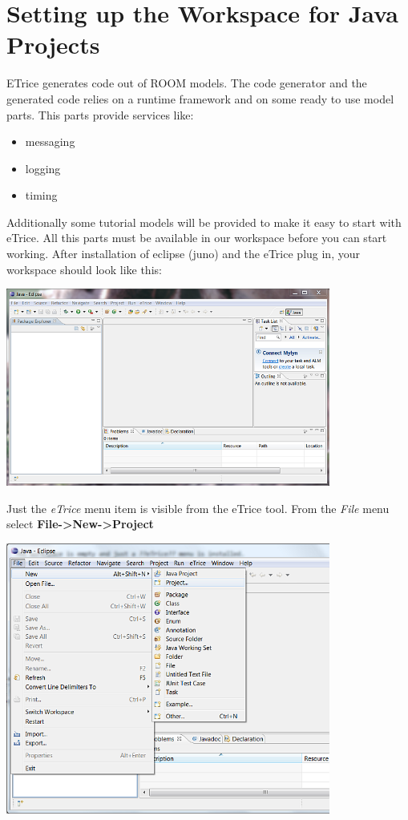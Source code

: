 \chapter{Setting up the Workspace for Java Projects}

ETrice generates code out of ROOM models. The code generator and the generated code relies on a runtime 
framework and on some ready to use model parts. This parts provide services like:

\begin{itemize}
\item messaging
\item logging
\item timing
\end{itemize}

Additionally some tutorial models will be provided to make it easy to start with eTrice. All this parts 
must be available in our workspace before you can start working. After installation of eclipse (juno) and 
the eTrice plug in, your workspace should look like this:  

\includegraphics[width=0.8\textwidth]{images/013-SetupWorkspace01.png}

Just the \textit{eTrice} menu item is visible from the eTrice tool.
From the \textit{File} menu select \textbf{File->New->Project}

\includegraphics[width=0.8\textwidth]{images/013-SetupWorkspace02.png}

